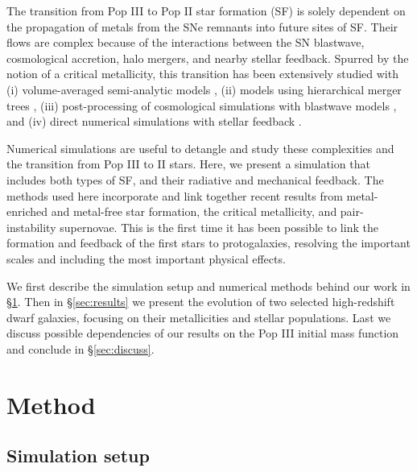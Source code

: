 \documentclass[apjl]{emulateapj}
\begin{document}
The transition from Pop III to Pop II star formation (SF) is solely
dependent on the propagation of metals from the SNe remnants into
future sites of SF.  Their flows are complex because of the
interactions between the SN blastwave, cosmological accretion, halo
mergers, and nearby stellar feedback.  Spurred by the notion of a
critical metallicity, this transition has been extensively studied
with (i) volume-averaged semi-analytic models \citep{Scannapieco03,
  Yoshida04, Furlanetto05_Reion}, (ii) models using hierarchical
merger trees \citep{Tumlinson06, Tumlinson10, Salvadori07, Komiya10},
(iii) post-processing of cosmological simulations with blastwave
models \citep{Karlsson08, Trenti09, Trenti10}, and (iv) direct
numerical simulations with stellar feedback \citep{Tornatore07,
  Ricotti08, Maio10_Pop32, Maio10_Enrich}.

Numerical simulations are useful to detangle and study these
complexities and the transition from Pop III to II stars.  Here, we
present a simulation that includes both types of SF, and their
radiative and mechanical feedback.  The methods used here incorporate
and link together recent results from metal-enriched and metal-free
star formation, the critical metallicity, and pair-instability
supernovae.  This is the first time it has been possible to link the
formation and feedback of the first stars to protogalaxies, resolving
the important scales and including the most important physical
effects.

We first describe the simulation setup and numerical methods behind
our work in \S\ref{sec:setup}.  Then in \S\ref{sec:results} we present
the evolution of two selected high-redshift dwarf galaxies, focusing
on their metallicities and stellar populations.  Last we discuss
possible dependencies of our results on the Pop III initial mass
function and conclude in \S\ref{sec:discuss}.

\section{Method}
\label{sec:setup}

\subsection{Simulation setup}
\end{document}
